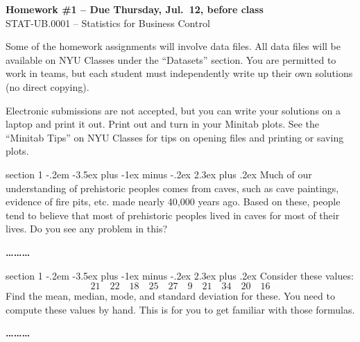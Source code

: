 \documentclass[11pt]{article}
\makeatletter
\newenvironment{problem}{\@startsection
       {section}
       {1}
       {-.2em}
       {-3.5ex plus -1ex minus -.2ex}
       {2.3ex plus .2ex}
       {\pagebreak[3]%
       \large\bf\noindent{Problem }
       }
       }
       {%
       \begin{center}\large\bf \ldots\ldots\ldots\end{center}}
\makeatother
\begin{document}
\begin{center}
  \large
  \textbf{Homework \#1 -- Due Thursday, Jul.~12, before class} \\
  STAT-UB.0001 -- Statistics for Business Control \\
\end{center}
\thispagestyle{empty}

\noindent   Some of the homework assignments will involve data files.  All data
files will be available on NYU Classes under the ``Datasets'' section.  You are
permitted to work in teams, but each student must independently write up their
own solutions (no direct copying).

Electronic submissions are not accepted, but you can write your solutions on a laptop and print it out. Print out and turn in your Minitab plots. See the ``Minitab Tips'' on NYU Classes  for tips on opening files and printing or saving plots.

\begin{problem}{}
Much of our understanding of prehistoric peoples comes from caves, such as cave paintings, evidence of fire pits, etc.  made nearly 40,000 years ago. Based on these, people tend to believe that most of prehistoric peoples lived in caves for most of their lives. Do you see any problem in this?
\end{problem}{}



\begin{problem}{}
Consider these values:
\[
  21 \hspace{1em}
  22 \hspace{1em}
  18 \hspace{1em}
  25 \hspace{1em}
  27 \hspace{1em}
  9 \hspace{1em}
  21 \hspace{1em}
  34 \hspace{1em}
  20 \hspace{1em}
  16 
\]
Find the mean, median, mode, and standard deviation for these. You need to compute these values by hand. This is for you to get familiar with those formulas.
\end{problem}
\end{document}
